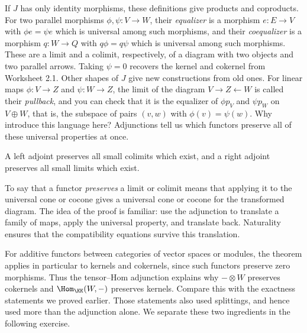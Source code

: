 \documentclass[12pt,reqno]{amsart}
\begin{document}
If $J$ has only identity morphisms, these definitions give products and coproducts. For two parallel morphisms $\phi,\psi:V\to W$, their \emph{equalizer} is a morphism $e:E\to V$ with $\phi e=\psi e$ which is universal among such morphisms, and their \emph{coequalizer} is a morphism $q:W\to Q$ with $q\phi=q\psi$ which is universal among such morphisms. These are a limit and a colimit, respectively, of a diagram with two objects and two parallel arrows. Taking $\psi=0$ recovers the kernel and cokernel from Worksheet 2.1. Other shapes of $J$ give new constructions from old ones. For linear maps $\phi:V\to Z$ and $\psi:W\to Z$, the limit of the diagram $V\to Z\leftarrow W$ is called their \emph{pullback}, and you can check that it is the equalizer of $\phi p_V$ and $\psi p_W$ on $V\oplus W$, that is, the subspace of pairs $(v,w)$ with $\phi(v)=\psi(w)$. Why introduce this language here? Adjunctions tell us which functors preserve all of these universal properties at once.

\begin{theorem}
A left adjoint preserves all small colimits which exist, and a right adjoint preserves all small limits which exist.
\end{theorem}

To say that a functor \emph{preserves} a limit or colimit means that applying it to the universal cone or cocone gives a universal cone or cocone for the transformed diagram. The idea of the proof is familiar: use the adjunction to translate a family of maps, apply the universal property, and translate back. Naturality ensures that the compatibility equations survive this translation.

For additive functors between categories of vector spaces or modules, the theorem applies in particular to kernels and cokernels, since such functors preserve zero morphisms. Thus the tensor--Hom adjunction explains why $-\otimes W$ preserves cokernels and $\Hom_{\KK}(W,-)$ preserves kernels. Compare this with the exactness statements we proved earlier. Those statements also used splittings, and hence used more than the adjunction alone. We separate these two ingredients in the following exercise.

\hrulefill
\end{document}
